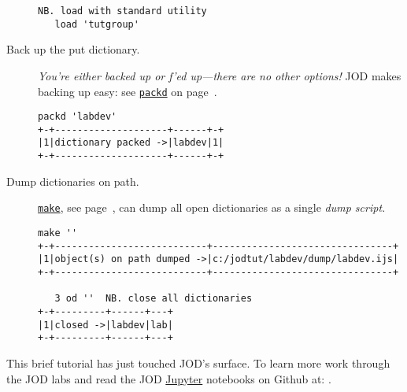 \begin{description}
\begin{lstlisting}[frame=single,framerule=0pt]
   NB. load with standard utility
   load 'tutgroup'  
\end{lstlisting}

\item[Back up the put dictionary.] \emph{You're either backed up or f'ed up---there are
no other options!} JOD makes backing up 
easy: see \hyperlink{il:packd}{\texttt{packd}} on page~\pageref{ss:packd}.
\begin{lstlisting}[frame=single,framerule=0pt] 
   packd 'labdev'
+-+--------------------+------+-+
|1|dictionary packed ->|labdev|1|
+-+--------------------+------+-+
\end{lstlisting}

\item[Dump dictionaries on path.] \hyperlink{il:make}{\texttt{make}}, see page~\pageref{ss:make},
can dump all open dictionaries as a single \emph{dump script.}
\begin{lstlisting}[frame=single,framerule=0pt]
   make ''
+-+---------------------------+--------------------------------+
|1|object(s) on path dumped ->|c:/jodtut/labdev/dump/labdev.ijs|
+-+---------------------------+--------------------------------+

   3 od '' 	NB. close all dictionaries
+-+---------+------+---+
|1|closed ->|labdev|lab|
+-+---------+------+---+
\end{lstlisting}

\end{description}

This brief tutorial has just touched JOD's surface.  To learn more work through the JOD labs
and read the JOD \href{https://jupyter.org/}{Jupyter} \cite{jupytersite} notebooks on Github at: .